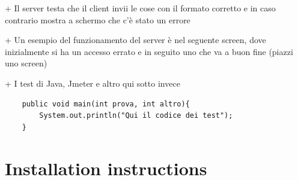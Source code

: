 \documentclass[numbers=noenddot, 12pt, a4paper, oneside]{scrbook}
\begin{document}
+ Il server testa che il client invii le cose con il formato corretto e in caso contrario mostra a schermo che c'è stato un errore

+ Un esempio del funzionamento del server è nel seguente screen, dove inizialmente si ha un accesso errato e in seguito uno che va a buon fine 
(piazzi uno screen)


+ I test di Java, Jmeter e altro qui sotto invece

\lstset{language=Java}
\begin{lstlisting}
	public void main(int prova, int altro){
		System.out.println("Qui il codice dei test");
	}
\end{lstlisting}


\chapter{Installation instructions}
\end{document}
